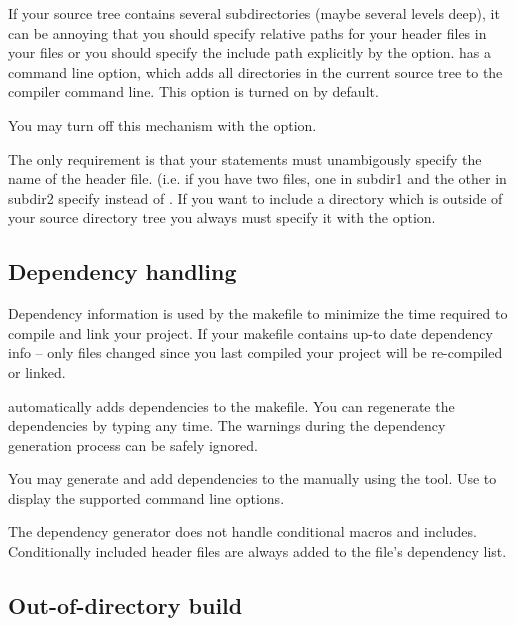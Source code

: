 If your source tree contains several subdirectories (maybe several levels
deep), it can be annoying that you should specify relative paths for your
header files in your  files or you should specify the include path
explicitly by the  option.  has a
command line option, which adds all directories in the current source tree 
to the compiler command line. This option is turned on by default.

\begin{note}
You may turn off this mechanism with the  option.
\end{note}

The only requirement is that your  statements must unambigously
specify the name of the header file. (i.e. if you have two 
files, one in subdir1 and the other in subdir2 specify  instead of . If you want to
include a directory which is outside of your source directory tree you
always must specify it with the  option.


\subsection{Dependency handling}

Dependency information is used by the makefile to minimize the time required to
compile and link your project. If your makefile contains up-to date dependency info 
-- only files changed since you last compiled your project will be re-compiled or linked.


 automatically adds dependencies to the makefile.
You can regenerate the dependencies by typing  any time.
The warnings during the dependency generation process can be safely ignored.


You may generate and add dependencies to the  manually using the 
tool. Use  to display the supported command line options.

\begin{note}
The dependency generator does not handle conditional macros and includes. Conditionally included header
files are always added to the file's dependency list.
\end{note}


\subsection{Out-of-directory build}

